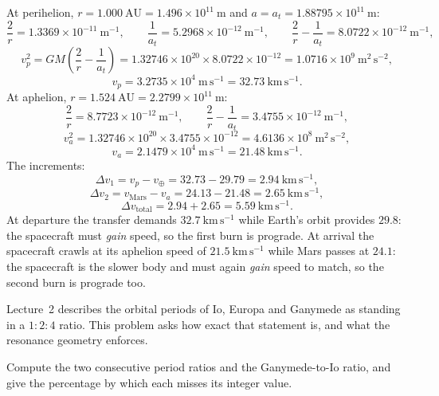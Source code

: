 \begin{solution}
At perihelion, $r = 1.000\ \mathrm{AU} = 1.496 \times 10^{11}\ \mathrm{m}$ and
$a = a_t = 1.88795 \times 10^{11}\ \mathrm{m}$:
\[
  \frac{2}{r} = 1.3369 \times 10^{-11}\ \mathrm{m^{-1}},
  \qquad
  \frac{1}{a_t} = 5.2968 \times 10^{-12}\ \mathrm{m^{-1}},
  \qquad
  \frac{2}{r} - \frac{1}{a_t} = 8.0722 \times 10^{-12}\ \mathrm{m^{-1}},
\]
\[
  v_p^2 = GM\left(\frac{2}{r} - \frac{1}{a_t}\right)
        = 1.32746 \times 10^{20} \times 8.0722 \times 10^{-12}
        = 1.0716 \times 10^{9}\ \mathrm{m^2\,s^{-2}},
\]
\[
  v_p = 3.2735 \times 10^{4}\ \mathrm{m\,s^{-1}} = 32.73\ \mathrm{km\,s^{-1}}.
\]
At aphelion, $r = 1.524\ \mathrm{AU} = 2.2799 \times 10^{11}\ \mathrm{m}$:
\[
  \frac{2}{r} = 8.7723 \times 10^{-12}\ \mathrm{m^{-1}},
  \qquad
  \frac{2}{r} - \frac{1}{a_t} = 3.4755 \times 10^{-12}\ \mathrm{m^{-1}},
\]
\[
  v_a^2 = 1.32746 \times 10^{20} \times 3.4755 \times 10^{-12}
        = 4.6136 \times 10^{8}\ \mathrm{m^2\,s^{-2}},
\]
\[
  v_a = 2.1479 \times 10^{4}\ \mathrm{m\,s^{-1}} = 21.48\ \mathrm{km\,s^{-1}}.
\]
The increments:
\[
  \Delta v_1 = v_p - v_\oplus = 32.73 - 29.79 = 2.94\ \mathrm{km\,s^{-1}},
\]
\[
  \Delta v_2 = v_{\mathrm{Mars}} - v_a = 24.13 - 21.48 = 2.65\ \mathrm{km\,s^{-1}},
\]
\[
  \Delta v_{\mathrm{total}} = 2.94 + 2.65 = 5.59\ \mathrm{km\,s^{-1}}.
\]
At departure the transfer demands $32.7\ \mathrm{km\,s^{-1}}$ while Earth's orbit provides
$29.8$: the spacecraft must \emph{gain} speed, so the first burn is prograde. At arrival the
spacecraft crawls at its aphelion speed of $21.5\ \mathrm{km\,s^{-1}}$ while Mars passes at
$24.1$: the spacecraft is the slower body and must again \emph{gain} speed to match, so the
second burn is prograde too.
\end{solution}



Lecture~2 describes the orbital periods of Io, Europa and Ganymede as standing in a $1:2:4$ ratio.
This problem asks how exact that statement is, and what the resonance geometry enforces.

\parti Compute the two consecutive period ratios and the Ganymede-to-Io ratio, and give the
percentage by which each misses its integer value.

